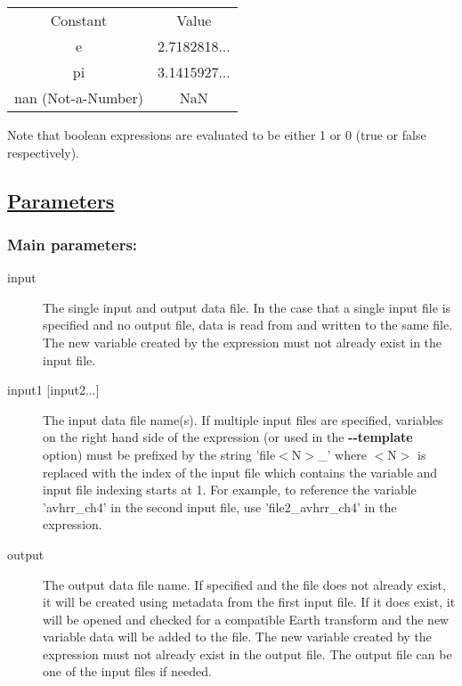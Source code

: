 \begin{tabular}{|c|c|}
\hline 
 & \\
 \hline 
Constant &Value \\
 \hline 
e &2.7182818... \\
 \hline 
pi &3.1415927... \\
 \hline 
nan (Not-a-Number) &NaN \\
 \hline 

\end{tabular}



 Note that boolean expressions are evaluated to be either 1 or 0 (true or false respectively). 
\subsection*{\underline{Parameters}}
\subsubsection*{Main parameters:}
\begin{description}
\item[input]The single input and output data file. In the case that a single input file is specified and no output file, data is read from and written to the same file. The new variable created by the expression must not already exist in the input file.
\item[input1 [input2...{]}]The input data file name(s). If multiple input files are specified, variables on the right hand side of the expression (or used in the \textbf{-{-}template}
 option) must be prefixed by the string 'file$<$N$>$\_' where $<$N$>$ is replaced with the index of the input file which contains the variable and input file indexing starts at 1. For example, to reference the variable 'avhrr\_ch4' in the second input file, use 'file2\_avhrr\_ch4' in the expression.
\item[output]The output data file name. If specified and the file does not already exist, it will be created using metadata from the first input file. If it does exist, it will be opened and checked for a compatible Earth transform and the new variable data will be added to the file. The new variable created by the expression must not already exist in the output file. The output file can be one of the input files if needed.

\end{description}
